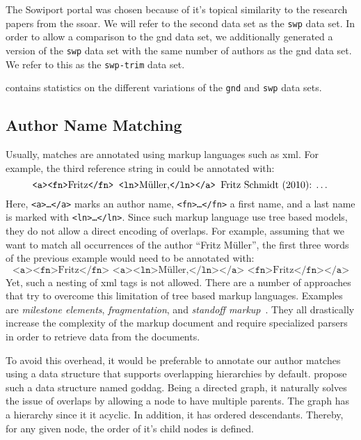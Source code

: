 The Sowiport portal was chosen because of it's topical similarity to the research papers from the \gls{ssoar}.
We will refer to the second data set as the \texttt{swp} data set.
In order to allow a comparison to the \gls{gnd} data set, we additionally generated a version of the \texttt{swp} data set with the same number of authors as the \gls{gnd} data set.
We refer to this as the \texttt{swp-trim} data set.

 contains statistics on the different variations of the \texttt{gnd} and \texttt{swp} data sets.

\subsection{Author Name Matching}\label{subsec:i-author-name-matching}
Usually, matches are annotated using markup languages such as \gls{xml}.
For example, the third reference string in  could be annotated with:
\begin{equation*}
  \texttt{<a><fn>}\text{Fritz}\texttt{</fn> <ln>}\text{M\"{u}ller,}\texttt{</ln></a> }\text{Fritz Schmidt (2010): \dots}
\end{equation*}
Here, \texttt{<a>\dots</a>} marks an author name, \texttt{<fn>\dots</fn>} a first name, and a last name is marked with \texttt{<ln>\dots</ln>}.
Since such markup language use tree based models, they do not allow a direct encoding of overlaps.
For example, assuming that we want to match all occurrences of the author ``Fritz M\"{u}ller'', the first three words of the previous example would need to be annotated with:
\begin{equation*}
  \texttt{<a><fn>}\text{Fritz}\texttt{</fn> <a><ln>}\text{M\"{u}ller,}\texttt{</ln></a> <fn>}\text{Fritz}\texttt{</fn></a>}
\end{equation*}
Yet, such a nesting of \gls{xml} tags is not allowed.
There are a number of approaches that try to overcome this limitation of tree based markup languages.
Examples are \textit{milestone elements}, \textit{fragmentation}, and \textit{standoff markup}~\citep{sperberg2000goddag}. They all drastically increase the complexity of the markup document and require specialized parsers in order to retrieve data from the documents.

To avoid this overhead, it would be preferable to annotate our author matches using a data structure that supports overlapping hierarchies by default.
\citet{sperberg2000goddag} propose such a data structure named \acrfull{goddag}.
Being a directed graph, it naturally solves the issue of overlaps by allowing a node to have multiple parents.
The graph has a hierarchy since it it acyclic.
In addition, it has ordered descendants.
Thereby, for any given node, the order of it's child nodes is defined.

